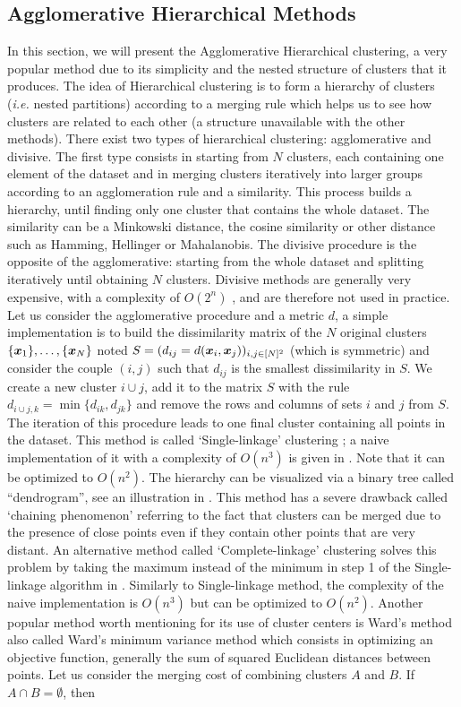 \subsection{Agglomerative Hierarchical Methods}
In this section, we will present the Agglomerative Hierarchical clustering, a very popular method due to its simplicity and the nested structure of clusters that it produces. The idea of Hierarchical clustering is to form a hierarchy of clusters (\textit{i.e.} nested partitions) according to a merging rule which helps us to see how clusters are related to each other (a structure unavailable with the other methods). There exist two types of hierarchical clustering: agglomerative and divisive. The first type consists in starting from $N$ clusters, each containing one element of the dataset and in merging clusters iteratively into larger groups according to an agglomeration rule and a similarity. This process builds a hierarchy, until finding only one cluster that contains the whole dataset. The similarity can be a Minkowski distance, the cosine similarity or other distance such as Hamming, Hellinger or Mahalanobis.  The divisive procedure is the opposite of the agglomerative: starting from the whole dataset and splitting iteratively until obtaining $N$ clusters. Divisive methods are generally very expensive, with a complexity of $O(2^n)$ \citep{Guenoche1991}, and are therefore not used in practice. 
Let us consider the agglomerative procedure and a metric $d$, a simple implementation is to build the dissimilarity matrix of the $N$ original clusters $\{\boldsymbol x_1\},\dots,\{\boldsymbol x_N\}$ noted $S=(d_{ij}=d(\boldsymbol x_i,\boldsymbol x_j))_{i,j\in [N]^2}$ (which is symmetric) and consider the couple $(i,j)$ such that $d_{ij}$ is the smallest dissimilarity in $S$. We create a new cluster $i \cup j$, add it to the matrix $S$ with the rule $d_{i\cup j, k}=\min\{d_{ik},d_{jk}\}$ and remove the rows and columns of sets $i$ and $j$ from $S$. The iteration of this procedure leads to one final cluster containing all points in the dataset. This method is called `Single-linkage' clustering \citep{Graham:1985:HMS:1435654.1436662}; a naive implementation of it with a complexity of $O(n^3)$ is given in . Note that it can be optimized to $O(n^2)$\citep{hierarchicalMurtagh}. The hierarchy can be visualized via a binary tree called ``dendrogram'', see an illustration in . This method has a severe drawback called `chaining phenomenon' referring to the fact that clusters can be merged due to the presence of close points even if they contain other points that are very distant. An alternative method called `Complete-linkage' clustering solves this problem by taking the maximum instead of the minimum in step 1 of the Single-linkage algorithm in . Similarly to Single-linkage method, the complexity of the naive implementation is $O(n^3)$ but can be optimized to $O(n^2)$. Another popular method worth mentioning for its use of cluster centers is Ward's method\citep{ward63} also called Ward's minimum variance method which consists in optimizing an objective function, generally the sum of squared Euclidean distances between points. Let us consider the merging cost of combining clusters $A$ and $B$. If $A\cap B = \emptyset$, then
